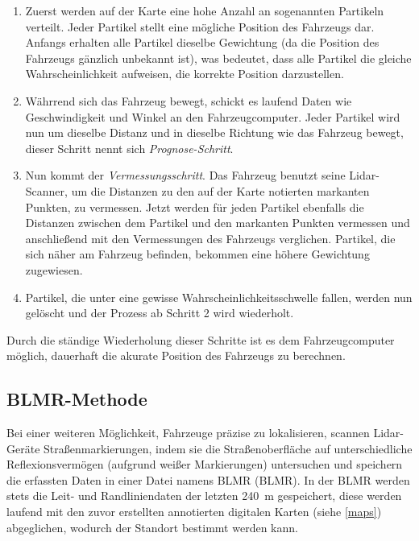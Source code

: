 \begin{enumerate}
  \item{Zuerst werden auf der Karte eine hohe Anzahl an sogenannten Partikeln verteilt. Jeder Partikel stellt eine mögliche Position des Fahrzeugs dar. Anfangs erhalten alle Partikel dieselbe Gewichtung (da die Position des Fahrzeugs gänzlich unbekannt ist), was bedeutet, dass alle Partikel die gleiche Wahrscheinlichkeit aufweisen, die korrekte Position darzustellen.}

  \item{Währrend sich das Fahrzeug bewegt, schickt es laufend Daten wie Geschwindigkeit und Winkel an den Fahrzeugcomputer. Jeder Partikel wird nun um dieselbe Distanz und in dieselbe Richtung wie das Fahrzeug bewegt, dieser Schritt nennt sich \textit{Prognose-Schritt}}.

  \item{Nun kommt der \textit{Vermessungsschritt}. Das Fahrzeug benutzt seine \acs{Lidar}-Scanner}, um die Distanzen zu den auf der Karte notierten markanten Punkten, zu vermessen. Jetzt werden für jeden Partikel ebenfalls die Distanzen zwischen dem Partikel und den markanten Punkten vermessen und anschließend mit den Vermessungen des Fahrzeugs verglichen. Partikel, die sich näher am Fahrzeug befinden, bekommen eine höhere Gewichtung zugewiesen.

  \item{Partikel, die unter eine gewisse Wahrscheinlichkeitsschwelle fallen, werden nun gelöscht und der Prozess ab Schritt 2 wird wiederholt.}
\end{enumerate}

Durch die ständige Wiederholung dieser Schritte ist es dem Fahrzeugcomputer möglich, dauerhaft die akurate Position des Fahrzeugs zu berechnen.

\subsection{BLMR-Methode}

Bei einer weiteren Möglichkeit, Fahrzeuge präzise zu lokalisieren, scannen \acs{Lidar}-Geräte Straßenmarkierungen, indem sie die Straßenoberfläche auf unterschiedliche Reflexionsvermögen (aufgrund weißer Markierungen) untersuchen und speichern die erfassten Daten in einer Datei namens \acs{BLMR} (\acl{BLMR}). In der \acs{BLMR} werden stets die Leit- und Randliniendaten der letzten \SI{240}{\meter} gespeichert, diese werden laufend mit den zuvor erstellten annotierten digitalen Karten (siehe \ref{maps}) abgeglichen, wodurch der Standort bestimmt werden kann. 

